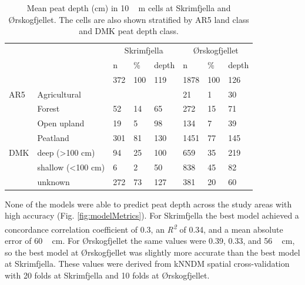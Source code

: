 \documentclass[soil, manuscript]{copernicus}
\begin{document}
\begin{table}[tbp]
\caption{Mean peat depth (cm) in \unit{10\,m} cells at Skrimfjella and Ørskogfjellet. The cells are also shown stratified by AR5 land class and DMK peat depth class.}
\begin{tabular}{llllllll}
\hline
    &                            & \multicolumn{3}{c}{Skrimfjella} & \multicolumn{3}{c}{Ørskogfjellet} \\ \cline{3-8} 
    &                            & n        & \%      & depth      & n          & \%      & depth      \\ \hline
    &                            & 372      & 100     & 119        & 1878       & 100     & 126        \\
AR5 & Agricultural               &          &         &            & 21         & 1       & 30         \\
    & Forest                     & 52       & 14      & 65         & 272        & 15      & 71         \\
    & Open upland                & 19       & 5       & 98         & 134        & 7       & 39         \\
    & Peatland                   & 301      & 81      & 130        & 1451       & 77      & 145        \\
DMK & deep (\textgreater 100 cm) & 94       & 25      & 100        & 659        & 35      & 219        \\
    & shallow (\textless 100 cm) & 6        & 2       & 50         & 838        & 45      & 82         \\
    & unknown                    & 272      & 73      & 127        & 381        & 20      & 60         \\ \hline
\end{tabular}
\label{tab:depthsByClass}
\end{table}

None of the models were able to predict peat depth across the study areas with high accuracy (Fig. \ref{fig:modelMetrics}).
For Skrimfjella the best model achieved a concordance correlation coefficient of 0.3, an \emph{R\textsuperscript{2}} of 0.34, and a mean absolute error of \unit{60\,cm}.
For Ørskogfjellet the same values were 0.39, 0.33, and \unit{56\,cm}, so the best model at Ørskogfjellet was slightly more accurate than the best model at Skrimfjella.
These values were derived from kNNDM spatial cross-validation with 20 folds at Skrimfjella and 10 folds at Ørskogfjellet.
\end{document}
